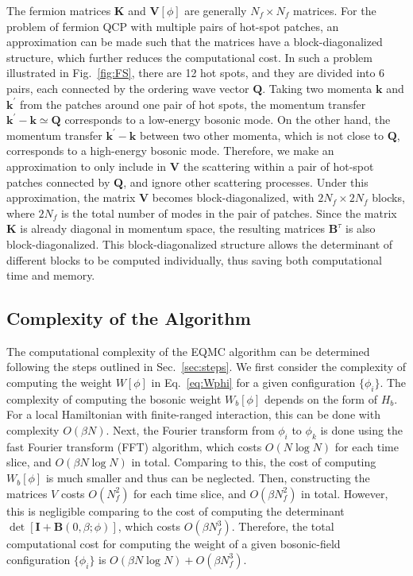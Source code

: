 \documentclass[aps,prx,twocolumn,superscriptaddress,showpacs,floatfix]{revtex4-1}
\begin{document}
The fermion matrices $\mathbf{K}$ and $\mathbf{V}[\phi]$ are generally $N_f\times N_f$ matrices.
For the problem of fermion QCP with multiple pairs of hot-spot patches, an approximation can be made such that the matrices have a block-diagonalized structure, which further reduces the computational cost.
In such a problem illustrated in Fig.~\ref{fig:FS}, there are 12 hot spots, and they are divided into 6 pairs, each connected by the ordering wave vector $\mathbf{Q}$.
Taking two momenta $\mathbf{k}$ and $\mathbf{k^\prime}$ from the patches around one pair of hot spots, the momentum transfer $\mathbf{k^\prime}-\mathbf{k}\simeq \mathbf{Q}$ corresponds to a low-energy bosonic mode.
On the other hand, the momentum transfer $\mathbf{k^\prime}-\mathbf{k}$ between two other momenta, which is not close to $\mathbf{Q}$, corresponds to a high-energy bosonic mode.
Therefore, we make an approximation to only include in $\mathbf{V}$ the scattering within a pair of hot-spot patches connected by $\mathbf{Q}$, and ignore other scattering processes. Under this approximation, the matrix $\mathbf{V}$ becomes block-diagonalized, with $2N_f\times 2N_f$ blocks, where $2N_f$ is the total number of modes in the pair of patches. Since the matrix $\mathbf{K}$ is already diagonal in momentum space, the resulting matrices $\mathbf B^\tau$ is also block-diagonalized.
This block-diagonalized structure allows the determinant of different blocks to be computed individually, thus saving both computational time and memory.

\subsection{Complexity of the Algorithm}
\label{sec:complexity}

The computational complexity of the EQMC algorithm can be determined following the steps outlined in Sec.~\ref{sec:steps}.
We first consider the complexity of computing the weight $W[\phi]$ in Eq.~\eqref{eq:Wphi} for a given configuration $\{\phi_i\}$.
The complexity of computing the bosonic weight $W_b[\phi]$ depends on the form of $H_b$.
For a local Hamiltonian with finite-ranged interaction, this can be done with complexity $O(\beta N)$.
Next, the Fourier transform from $\phi_i$ to $\phi_k$ is done using the fast Fourier transform (FFT) algorithm, which costs $O(N\log N)$ for each time slice, and $O(\beta N\log N)$ in total.
Comparing to this, the cost of computing $W_b[\phi]$ is much smaller and thus can be neglected.
Then, constructing the matrices $V$ costs $O(N_f^2)$ for each time slice, and $O(\beta N_f^2)$ in total.
However, this is negligible comparing to the cost of computing the determinant $\det[\mathbf{I} + \mathbf{B}(0,\beta;\phi)]$, which costs $O(\beta N_f^3)$.
Therefore, the total computational cost for computing the weight of a given bosonic-field configuration $\{\phi_i\}$ is $O(\beta N\log N) + O(\beta N_f^3)$.
\end{document}
